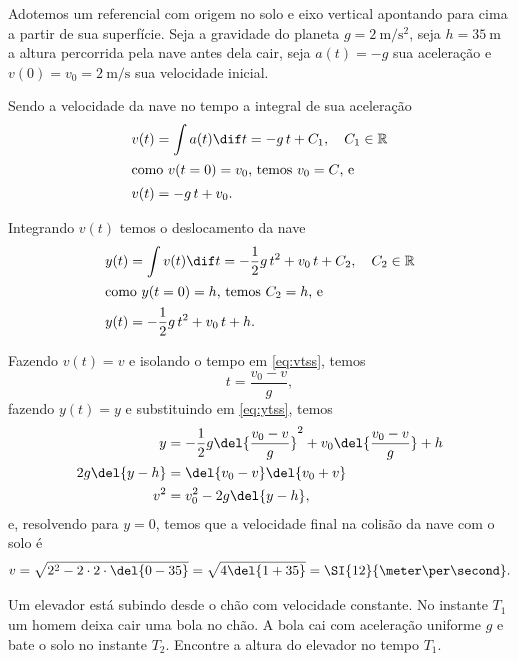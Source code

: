 \documentclass[]{IMTexam}
\begin{document}
\begin{questions}
	\begin{solution}
		Adotemos um referencial com origem no solo e eixo vertical apontando para cima a partir de sua superfície. Seja a gravidade do planeta $ g=\SI{2}{\meter\per\second\squared} $, seja $ h=\SI{35}{\meter} $ a altura percorrida pela nave antes dela cair, seja $ a(t)=-g $ sua aceleração e $ v(0)=v_0=\SI{2}{\meter\per\second} $ sua velocidade inicial.

		Sendo a velocidade da nave no tempo a integral de sua aceleração
		\begin{align}
			v(t) & =\int a(t)\dif t=-g\,t+C_1,\quad C_1\in\mathbb{R}\nonumber \\
			\intertext{como $ v(t=0)=v_0 $, temos $ v_0=C $, e}
			v(t) & =-g\,t+v_0.\label{eq:vtss}
		\end{align}

		Integrando $ v(t) $ temos o deslocamento da nave
		\begin{align}
			y(t) & =\int v(t)\dif t=-\dfrac{1}{2}g\,t^{2}+v_0\,t+C_2,\quad C_2\in\mathbb{R}\nonumber \\
			\intertext{como $ y(t=0)=h $, temos $ C_2=h $, e}
			y(t) & =-\dfrac{1}{2}g\,t^{2}+v_0\,t+h.\label{eq:ytss}
		\end{align}

		Fazendo $ v(t)=v $ e isolando o tempo em \ref{eq:vtss}, temos
		\[ t=\dfrac{v_0-v}{g}, \]
		fazendo $ y(t)=y $ e substituindo em \ref{eq:ytss}, temos
		\begin{align}
			y           & =-\dfrac{1}{2}g\del{\dfrac{v_0-v}{g}}^{2}+v_0\del{\dfrac{v_0-v}{g}}+h\nonumber \\
			2g\del{y-h} & =\del{v_0-v}\del{v_0+v}\nonumber                                               \\
			v^{2}       & =v_0^{2}-2g\del{y-h},\label{eq:torrq3}
		\end{align}
		e, resolvendo para $ y=0 $, temos que a velocidade final na colisão da nave com o solo é \[  v=\sqrt{2^{2}-2\cdot2\cdot\del{0-35}}=\sqrt{4\del{1+35}}=\SI{12}{\meter\per\second}. \]
	\end{solution}

	\question Um elevador está subindo desde o chão com velocidade constante. No instante $ T_1 $ um homem deixa cair uma bola no chão. A bola cai com aceleração uniforme $ g $ e bate o solo no instante $ T_2 $. Encontre a altura do elevador no tempo $ T_1 $.


\end{questions}
\end{document}
